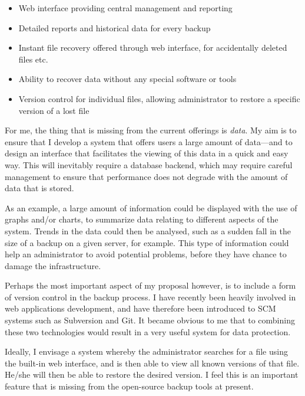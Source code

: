 \documentclass[a4paper]{article}
\begin{document}
    \begin{itemize}
        \item Web interface providing central management and reporting
        \item Detailed reports and historical data for every backup
        \item Instant file recovery offered through web interface, for
            accidentally deleted files etc.
        \item Ability to recover data without any special software or tools
        \item Version control for individual files, allowing administrator to
            restore a specific version of a lost file
    \end{itemize}

    For me, the thing that is missing from the current offerings is
    \emph{data}. My aim is to ensure that I develop a system that offers users
    a large amount of data---and to design an interface that facilitates the
    viewing of this data in a quick and easy way. This will inevitably require
    a database backend, which may require careful management to ensure that
    performance does not degrade with the amount of data that is stored.

    As an example, a large amount of information could be displayed with the
    use of graphs and/or charts, to summarize data relating to different
    aspects of the system. Trends in the data could then be analysed, such as
    a sudden fall in the size of a backup on a given server, for example. This
    type of information could help an administrator to avoid potential
    problems, before they have chance to damage the infrastructure.

    Perhaps the most important aspect of my proposal however, is to include
    a form of version control in the backup process. I have recently been
    heavily involved in web applications development, and have therefore been
    introduced to SCM systems such as Subversion and Git. It became obvious to
    me that to combining these two technologies would result in a very useful
    system for data protection.

    Ideally, I envisage a system whereby the administrator searches for a file
    using the built-in web interface, and is then able to view all known
    versions of that file. He/she will then be able to restore the desired
    version. I feel this is an important feature that is missing from the
    open-source backup tools at present.
    
\end{document}
